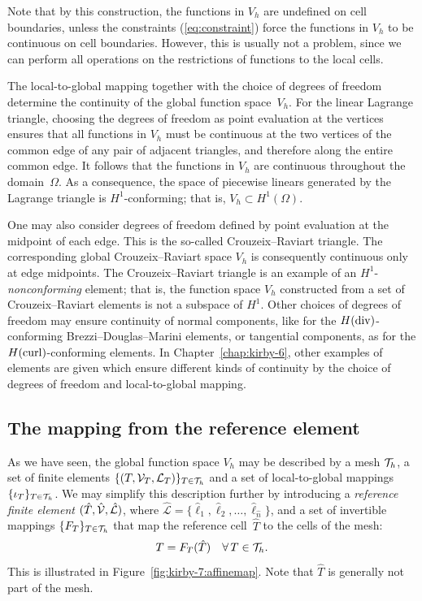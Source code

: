 Note that by this construction, the functions in $V_h$ are undefined
on cell boundaries, unless the constraints (\ref{eq:constraint}) force
the functions in $V_h$ to be continuous on cell boundaries. However,
this is usually not a problem, since we can perform all operations on
the restrictions of functions to the local cells.

The local-to-global mapping together with the choice of degrees of
freedom determine the continuity of the global function space~$V_h$.
For the linear Lagrange triangle, choosing the degrees of freedom as
point evaluation at the vertices ensures that all functions in $V_h$
must be continuous at the two vertices of the common edge of any pair
of adjacent triangles, and therefore along the entire common edge. It
follows that the functions in $V_h$ are continuous throughout the
domain~$\Omega$. As a consequence, the space of piecewise linears
generated by the Lagrange triangle is $H^1$-conforming; that is, $V_h
\subset H^1(\Omega)$.

%
One may also consider degrees of freedom defined by point evaluation
at the midpoint of each edge. This is the so-called Crouzeix--Raviart
triangle. The corresponding global Crouzeix--Raviart space $V_h$ is
consequently continuous only at edge midpoints. The Crouzeix--Raviart
triangle is an example of an $H^1$-\emph{nonconforming} element; that
is, the function space $V_h$ constructed from a set of
Crouzeix--Raviart elements is not a subspace of $H^1$. Other choices
of degrees of freedom may ensure continuity of normal components, like
for the $H(\mathrm{div})$-conforming Brezzi--Douglas--Marini elements, or
tangential components, as for the $H(\mathrm{curl})$-conforming \nedelec{}
elements. In Chapter~\ref{chap:kirby-6}, other examples of elements
are given which ensure different kinds of continuity by the choice of
degrees of freedom and local-to-global mapping.

\enlargethispage{12pt}

\vspace*{-6pt}\subsection{The mapping from the reference element}

As we have seen, the global function space $V_h$ may be described by a
mesh $\mathcal{T}_h$, a set of finite elements
$\{(T,\mathcal{V}_T,\mathcal{L}_T)\}_{T\in\mathcal{T}_h}$ and a set of
local-to-global mappings $\{\iota_T\}_{T\in\mathcal{T}_h}$. We may simplify
this description further by introducing a \emph{reference finite
  element} $(\hat{T},\hat{\mathcal{V}},\hat{\mathcal{L}})$,
where $\hat{\mathcal{L}} =
\{\hat{\ell}_1,\hat{\ell}_2,\ldots,\hat{\ell}_{\hat{n}}\}$, and
a set of invertible mappings $\{F_T\}_{T\in\mathcal{T}_h}$ that map the
reference cell~$\hat{T}$ to the cells of the mesh:
\begin{equation}
  T = F_T(\hat{T}) \quad \forall\, T \in \mathcal{T}_h.
\end{equation}
This is illustrated in Figure~\ref{fig:kirby-7:affinemap}. Note that
$\hat{T}$ is generally not part of the mesh.


